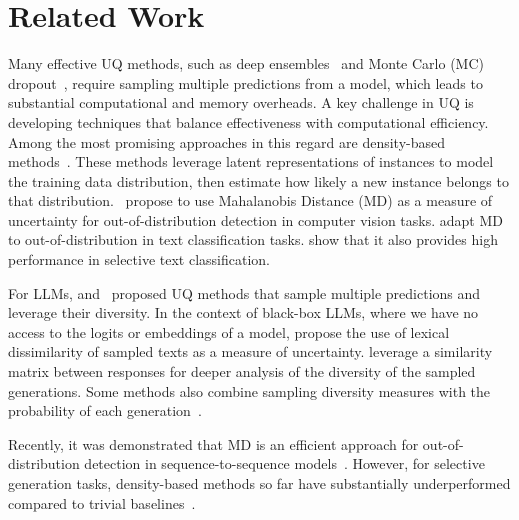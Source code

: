 \documentclass[11pt]{article}
\begin{document}
\section{Related Work}
  Many effective UQ methods, such as deep ensembles~\citep{NIPS2017_9ef2ed4b} and Monte Carlo (MC) dropout~\citep{gal2016dropout}, require sampling multiple predictions from a model, which leads to substantial computational and memory overheads. A key challenge in UQ is developing techniques that balance effectiveness with computational efficiency. Among the most promising approaches in this regard are density-based methods~\cite{lee2018simple,NEURIPS2020_543e8374,ddu_amersfoort,nuq_kotelevskii,yoo-etal-2022-detection}. These methods leverage latent representations of instances to model the training data distribution, then estimate how likely a new instance belongs to that distribution.~\citet{lee2018simple} propose to use Mahalanobis Distance (MD) as a measure of uncertainty for out-of-distribution detection in computer vision tasks. \citet{podolskiy2021revisiting} adapt  MD  to out-of-distribution in text classification tasks. \citet{vazhentsev-etal-2022-uncertainty,vazhentsev-etal-2023-efficient} show that it also provides high performance in selective text classification.  

  For LLMs, \citet{fomicheva-etal-2020-unsupervised} and~\citet{kuhn2023semantic} proposed UQ methods that sample multiple predictions and leverage their diversity. In the context of black-box LLMs, where we have no access to the logits or embeddings of a model, \citet{fomicheva-etal-2020-unsupervised} propose the use of lexical dissimilarity of sampled texts as a measure of uncertainty. \citet{lin2023generating} leverage a similarity matrix between responses for deeper analysis of the diversity of the sampled generations. Some methods also combine sampling diversity measures with the probability of each generation~\cite{kuhn2023semantic,duan-etal-2024-shifting,nikitin2024kernel,cheng-vlachos-2024-measuring,chen2024eigenscore,vashurin2025cocoageneralizedapproachuncertainty}.

  Recently, it was demonstrated that MD is an efficient approach for out-of-distribution detection in sequence-to-sequence models~\cite{vazhentsev-etal-2023-efficient,ren2023outofdistribution,darrin-etal-2023-rainproof}. However, for selective generation tasks, density-based methods so far have substantially underperformed compared to trivial baselines~\citep{vashurin2024benchmakring}.
\end{document}

